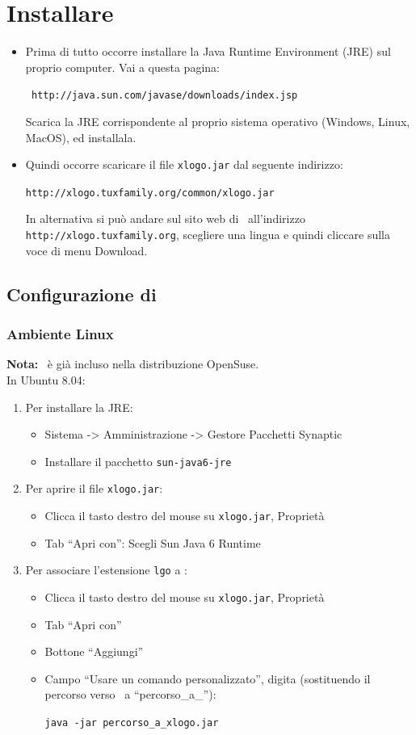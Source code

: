 \chapter{Installare \xlogo}
\noindent \begin{itemize}
 \item Prima di tutto occorre installare la Java Runtime Environment (JRE) sul proprio computer. Vai a questa pagina:
\begin{center}
\texttt{ http://java.sun.com/javase/downloads/index.jsp}
\end{center}
Scarica la JRE corrispondente al proprio sistema operativo (Windows, Linux, MacOS), ed installala. 
\item Quindi occorre scaricare il file \texttt{xlogo.jar} dal seguente indirizzo: 
\begin{center}
	\texttt{http://xlogo.tuxfamily.org/common/xlogo.jar}
\end{center}
In alternativa si può andare sul sito web di \xlogo\, all'indirizzo \texttt{http://xlogo.tuxfamily.org}, scegliere una lingua e quindi cliccare sulla voce di menu Download.
\end{itemize}
\section{Configurazione di \xlogo}
\subsection{Ambiente Linux}
\textbf{Nota:} \xlogo\ è già incluso nella distribuzione OpenSuse.\\
In Ubuntu 8.04:
\begin{enumerate}
 \item Per installare la JRE:
\begin{itemize}
 \item Sistema -> Amministrazione -> Gestore Pacchetti Synaptic
 \item Installare il pacchetto \texttt{sun-java6-jre}
\end{itemize}
 \item  Per aprire il file \texttt{xlogo.jar}:
\begin{itemize}
 \item Clicca il tasto destro del mouse su \texttt{xlogo.jar}, Proprietà
 \item Tab ``Apri con'': Scegli Sun Java 6 Runtime 
\end{itemize}
 \item Per associare l'estensione \texttt{lgo} a \xlogo:
\begin{itemize}
 \item Clicca il tasto destro del mouse su \texttt{xlogo.jar}, Proprietà
 \item Tab ``Apri con'' 
 \item Bottone ``Aggiungi''
 \item Campo ``Usare un comando personalizzato'', digita (sostituendo il percorso verso \xlogo\ a ``percorso\_a\_''):
\begin{center}
\texttt{java -jar percorso\_a\_xlogo.jar} 
\end{center}
\end{itemize}
\end{enumerate}


